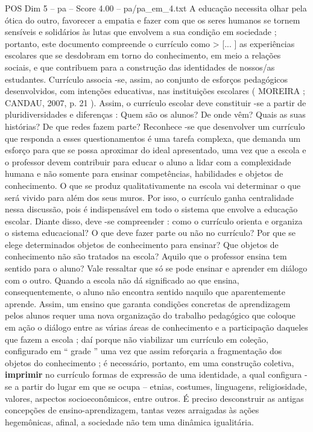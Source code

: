 \begin{textsample}{POS Dim 5 – pa – Score 4.00 – pa/pa\_em\_4.txt}
A educação necessita olhar pela ótica do outro, favorecer a empatia e fazer com que os seres humanos se tornem sensíveis e solidários às lutas que envolvem a sua condição em sociedade ; portanto, este documento compreende o currículo como > [... ] as experiências escolares que se desdobram em torno do conhecimento, em meio a relações sociais, e que contribuem para a construção das identidades de nossos/as estudantes.
Currículo associa -se, assim, ao conjunto de esforços pedagógicos desenvolvidos, com intenções educativas, nas instituições escolares ( MOREIRA ; CANDAU, 2007, p. 21 ).
Assim, o currículo escolar deve constituir -se a partir de pluridiversidades e diferenças : Quem são os alunos?
De onde vêm?
Quais as suas histórias?
De que redes fazem parte?
Reconhece -se que desenvolver um currículo que responda a esses questionamentos é uma tarefa complexa, que demanda um esforço para que se possa aproximar do ideal apresentado, uma vez que a escola e o professor devem contribuir para educar o aluno a lidar com a complexidade humana e não somente para ensinar competências, habilidades e objetos de conhecimento.
O que se produz qualitativamente na escola vai determinar o que será vivido para além dos seus muros.
Por isso, o currículo ganha centralidade nessa discussão, pois é indispensável em todo o sistema que envolve a educação escolar.
Diante disso, deve -se compreender : como o currículo orienta e organiza o sistema educacional?
O que deve fazer parte ou não no currículo?
Por que se elege determinados objetos de conhecimento para ensinar?
Que objetos de conhecimento não são tratados na escola?
Aquilo que o professor ensina tem sentido para o aluno?
Vale ressaltar que só se pode ensinar e aprender em diálogo com o outro.
Quando a escola não dá significado ao que ensina, consequentemente, o aluno não encontra sentido naquilo que aparentemente aprende.
Assim, um ensino que garanta condições concretas de aprendizagem pelos alunos requer uma nova organização do trabalho pedagógico que coloque em ação o diálogo entre as várias áreas de conhecimento e a participação daqueles que fazem a escola ; daí porque não viabilizar um currículo em coleção, configurado em “ grade ” uma vez que assim reforçaria a fragmentação dos objetos do conhecimento ; é necessário, portanto, em uma construção coletiva, \textbf{imprimir} no currículo formas de expressão de uma identidade, a qual configura -se a partir do lugar em que se ocupa – etnias, costumes, linguagens, religiosidade, valores, aspectos socioeconômicos, entre outros.
É preciso desconstruir as antigas concepções de ensino-aprendizagem, tantas vezes arraigadas às ações hegemônicas, afinal, a sociedade não tem uma dinâmica igualitária.

\end{textsample}
